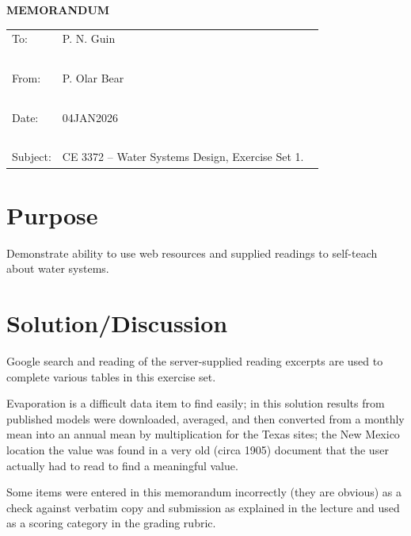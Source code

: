 \documentclass[12pt]{article}
\begin{document}
\begin{center}
\textbf{MEMORANDUM}
\end{center}
\begingroup
\begin{tabular}{p{1in} p{5in}}
\hline
\hline
To: & P. N. Guin \\ ~\\
From: & P. Olar Bear \\ ~\\
Date: & 04JAN2026 \\ ~\\
Subject: & CE 3372 -- Water Systems Design, Exercise Set 1. ~\\
\hline
\hline
\end{tabular}
\endgroup
\section*{{Purpose}} 
Demonstrate ability to use web resources and supplied readings to self-teach about water systems.
\section*{Solution/Discussion}
Google search and reading of the server-supplied reading excerpts are used to complete various tables in this exercise set.

Evaporation is a difficult data item to find easily; in this solution results from published models were downloaded, averaged, and then converted from a monthly mean into an annual mean by multiplication for the Texas sites; the New Mexico location the value was found in a very old (circa 1905) document that the user actually had to read to find a meaningful value.  

Some items were entered in this memorandum incorrectly (they are obvious) as a check against verbatim copy and submission as explained in the lecture and used as a scoring category in the grading rubric.
\end{document}
